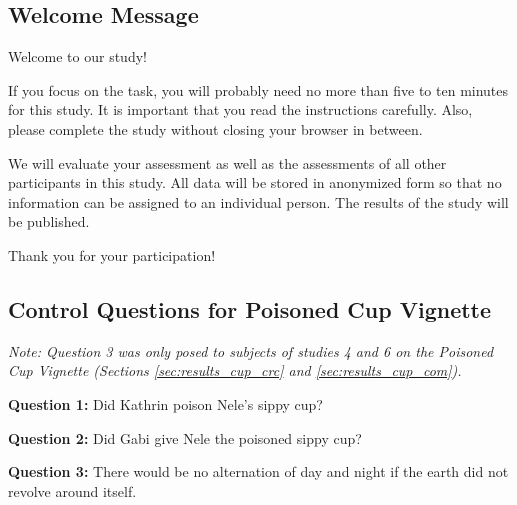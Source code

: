 \documentclass[egregdoesnotlikesansseriftitles,12pt]{scrartcl}
\begin{document}
\subsection{Welcome Message}\label{app:main_welcome}
Welcome to our study!%
	
If you focus on the task, you will probably need no more than five to ten minutes for this study. It is important that you read the instructions carefully. Also, please complete the study without closing your browser in between.%
	
We will evaluate your assessment as well as the assessments of all other participants in this study. All data will be stored in anonymized form so that no information can be assigned to an individual person. The results of the study will be published.%
	
Thank you for your participation!%

\subsection{Control Questions for Poisoned Cup Vignette}\label{app:main_cup_control}
\noindent\textit{Note: Question 3 was only posed to subjects of studies 4 and 6 on the Poisoned Cup Vignette (Sections \ref{sec:results_cup_crc} and \ref{sec:results_cup_com}).}

\vspace{1ex}
\noindent\textbf{Question 1:} Did Kathrin poison Nele's sippy cup?%

\vspace{1ex}
\noindent\textbf{Question 2:} Did Gabi give Nele the poisoned sippy cup?%

\vspace{1ex}
\noindent\textbf{Question 3:} There would be no alternation of day and night if the earth did not revolve around itself.%
\end{document}
